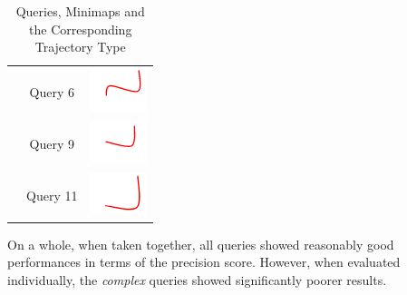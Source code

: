 \begin{table}[!tb]
\begin{tabular}{|c|c|c|}
 & Query 6 & \includegraphics{image/minimaps/query_06.png} \\ \cline{2-3}
 & Query 9 & \includegraphics{image/minimaps/query_09.png} \\ \cline{2-3}
 & Query 11 & \includegraphics{image/minimaps/query_11.png} \\ \hline
\end{tabular}
\caption{Queries, Minimaps and the Corresponding Trajectory Type}
\label{table:versionTwoComplexSimple}
\end{table}
On a whole, when taken together, all queries showed reasonably good performances in terms of the precision score. However, when evaluated individually, the \textit{complex} queries showed significantly poorer results. 

